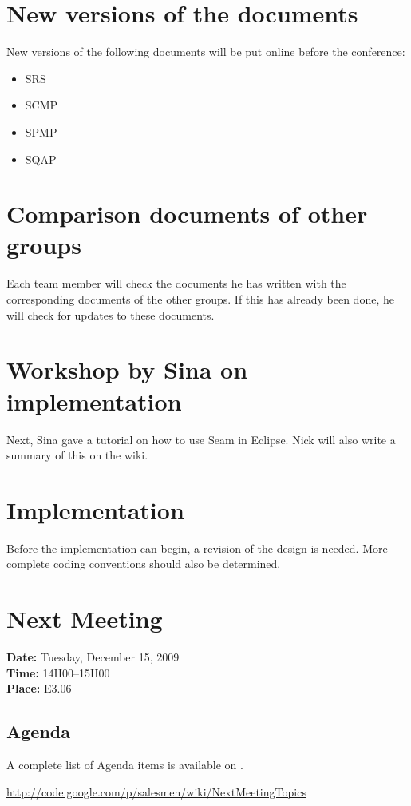 \documentclass[a4paper, 12pt]{article}
\begin{document}
	\section{New versions of the documents}
New versions of the following documents will be put online before the conference:
		\begin{itemize}
			\item SRS
			\item SCMP
			\item SPMP
			\item SQAP
		\end{itemize}
		
	\section{Comparison documents of other groups}
Each team member will check the documents he has written with the corresponding documents of the other groups. If this has already been done, he will check for updates to these documents.

	\section{Workshop by Sina on implementation}
Next, Sina gave a tutorial on how to use Seam in Eclipse. Nick will also write a summary of this on the wiki. 

	\section{Implementation}
Before the implementation can begin, a revision of the design is needed. More complete coding conventions should also be determined.	
	
	\section{Next Meeting}

		\textbf{Date:} Tuesday, December 15, 2009\\
		\textbf{Time:} 14H00--15H00\\
		\textbf{Place:} E3.06\\
	
		\subsection{Agenda}
A complete list of Agenda items is available on \cite{site6}.\\
	
	\begin{thebibliography}{99}
		\href{http://code.google.com/p/salesmen/wiki/NextMeetingTopics}{http://code.google.com/p/salesmen/wiki/NextMeetingTopics}

		
	\end{thebibliography}	
		
\end{document}
